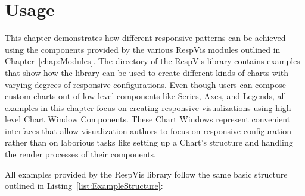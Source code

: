 \chapter{Usage}
\label{chap:Usage}

This chapter demonstrates how different responsive patterns can be achieved using the components provided by the various RespVis modules outlined in Chapter~\ref{chap:Modules}.
The  directory of the RespVis library contains examples that show how the library can be used to create different kinds of charts with varying degrees of responsive configurations.
Even though users can compose custom charts out of low-level components like Series, Axes, and Legends, all examples in this chapter focus on creating responsive visualizations using high-level Chart Window Components.
These Chart Windows represent convenient interfaces that allow visualization authors to focus on responsive configuration rather than on laborious tasks like setting up a Chart's structure and handling the render processes of their components.

All examples provided by the RespVis library follow the same basic structure outlined in Listing~\ref{list:ExampleStructure}:

